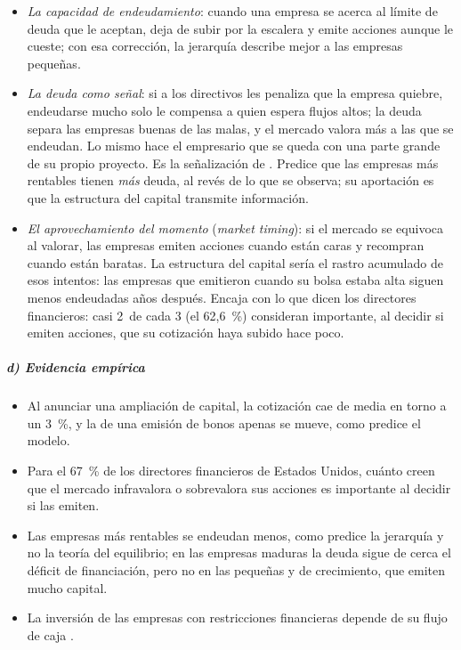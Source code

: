 \documentclass[11pt]{article}
\begin{document}
\begin{itemize}
\item \emph{La capacidad de endeudamiento}: cuando una empresa se acerca al límite de deuda que le aceptan, deja de subir por la escalera y emite acciones aunque le cueste; con esa corrección, la jerarquía describe mejor a las empresas pequeñas\nocite{LearyRoberts2010Pecking}.
\item \emph{La deuda como señal}: si a los directivos les penaliza que la empresa quiebre, endeudarse mucho solo le compensa a quien espera flujos altos; la deuda separa las empresas buenas de las malas, y el mercado valora más a las que se endeudan\nocite{Ross1977Determination}. Lo mismo hace el empresario que se queda con una parte grande de su propio proyecto\nocite{LelandPyle1977Informational}. Es la señalización de  . Predice que las empresas más rentables tienen \emph{más} deuda, al revés de lo que se observa; su aportación es que la estructura del capital transmite información.
\item \emph{El aprovechamiento del momento} (\emph{market timing}): si el mercado se equivoca al valorar, las empresas emiten acciones cuando están caras y recompran cuando están baratas. La estructura del capital sería el rastro acumulado de esos intentos: las empresas que emitieron cuando su bolsa estaba alta siguen menos endeudadas años después\nocite{BakerWurgler2002Market}. Encaja con lo que dicen los directores financieros: casi 2~de cada 3 (el 62,6~\%) consideran importante, al decidir si emiten acciones, que su cotización haya subido hace poco\nocite{GrahamHarvey2001Theory}.
\end{itemize}

\subparagraph{d) Evidencia empírica}

\begin{itemize}
\item Al anunciar una ampliación de capital, la cotización cae de media en torno a un 3~\%\nocite{AsquithMullins1986Equity,MasulisKorwar1986Seasoned}, y la de una emisión de bonos apenas se mueve\nocite{Smith1986Investment}, como predice el modelo.
\item Para el 67~\% de los directores financieros de Estados Unidos, cuánto creen que el mercado infravalora o sobrevalora sus acciones es importante al decidir si las emiten\nocite{GrahamHarvey2001Theory}.
\item Las empresas más rentables se endeudan menos, como predice la jerarquía y no la teoría del equilibrio\nocite{RajanZingales1995What,FamaFrench2002Testing}; en las empresas maduras la deuda sigue de cerca el déficit de financiación\nocite{ShyamSunderMyers1999Testing}, pero no en las pequeñas y de crecimiento, que emiten mucho capital\nocite{FrankGoyal2003Testing}.
\item La inversión de las empresas con restricciones financieras depende de su flujo de caja\nocite{FazzariHubbardPetersen1988} .
\end{itemize}
\end{document}
